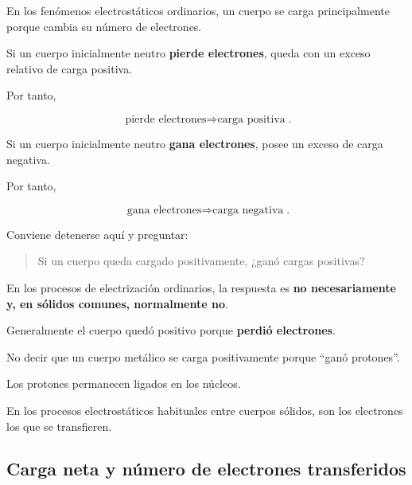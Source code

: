 En los fenómenos electrostáticos ordinarios, un cuerpo se carga
principalmente porque cambia su número de electrones.

Si un cuerpo inicialmente neutro \textbf{pierde electrones}, queda con un
exceso relativo de carga positiva.

Por tanto,

\begin{equation}
    \boxed{
    \text{pierde electrones}
    \Longrightarrow
    \text{carga positiva}
    }.
\end{equation}

Si un cuerpo inicialmente neutro \textbf{gana electrones}, posee un exceso de
carga negativa.

Por tanto,

\begin{equation}
    \boxed{
    \text{gana electrones}
    \Longrightarrow
    \text{carga negativa}
    }.
\end{equation}

\begin{notapedagogica}
Conviene detenerse aquí y preguntar:

\begin{quote}
Si un cuerpo queda cargado positivamente,
¿ganó cargas positivas?
\end{quote}

En los procesos de electrización ordinarios, la respuesta es
\textbf{no necesariamente y, en sólidos comunes, normalmente no}.

Generalmente el cuerpo quedó positivo porque
\textbf{perdió electrones}.
\end{notapedagogica}

\begin{errorfrecuente}
No decir que un cuerpo metálico se carga positivamente porque
``ganó protones''.

Los protones permanecen ligados en los núcleos.

En los procesos electrostáticos habituales entre cuerpos sólidos, son los
electrones los que se transfieren.
\end{errorfrecuente}



\subsection{Carga neta y número de electrones transferidos}


